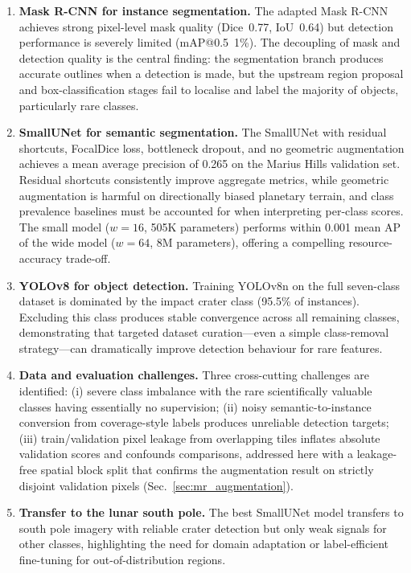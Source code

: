 \documentclass{aa}
\begin{document}
   \begin{enumerate}
      \item \textbf{Mask R-CNN for instance segmentation.} The adapted Mask R-CNN achieves strong pixel-level mask quality (Dice~0.77, IoU~0.64) but detection performance is severely limited (mAP@0.5~1\%). The decoupling of mask and detection quality is the central finding: the segmentation branch produces accurate outlines when a detection is made, but the upstream region proposal and box-classification stages fail to localise and label the majority of objects, particularly rare classes.
      \item \textbf{SmallUNet for semantic segmentation.} The SmallUNet with residual shortcuts, FocalDice loss, bottleneck dropout, and no geometric augmentation achieves a mean average precision of 0.265 on the Marius Hills validation set. Residual shortcuts consistently improve aggregate metrics, while geometric augmentation is harmful on directionally biased planetary terrain, and class prevalence baselines must be accounted for when interpreting per-class scores. The small model ($w=16$, 505K parameters) performs within 0.001 mean AP of the wide model ($w=64$, 8M parameters), offering a compelling resource-accuracy trade-off.
      \item \textbf{YOLOv8 for object detection.} Training YOLOv8n on the full seven-class dataset is dominated by the impact crater class (95.5\% of instances). Excluding this class produces stable convergence across all remaining classes, demonstrating that targeted dataset curation---even a simple class-removal strategy---can dramatically improve detection behaviour for rare features.
      \item \textbf{Data and evaluation challenges.} Three cross-cutting challenges are identified: (i) severe class imbalance with the rare scientifically valuable classes having essentially no supervision; (ii) noisy semantic-to-instance conversion from coverage-style labels produces unreliable detection targets; (iii) train/validation pixel leakage from overlapping tiles inflates absolute validation scores and confounds comparisons, addressed here with a leakage-free spatial block split that confirms the augmentation result on strictly disjoint validation pixels (Sec.~\ref{sec:mr_augmentation}).
      \item \textbf{Transfer to the lunar south pole.} The best SmallUNet model transfers to south pole imagery with reliable crater detection but only weak signals for other classes, highlighting the need for domain adaptation or label-efficient fine-tuning for out-of-distribution regions.
   \end{enumerate}
\end{document}
